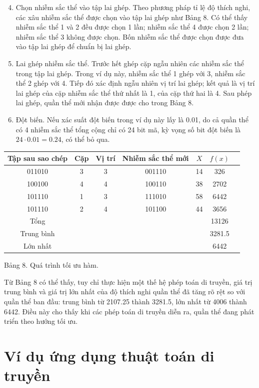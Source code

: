 \documentclass[11pt]{article}
\begin{document}
\begin{enumerate}
  \setcounter{enumi}{3}
  \item Chọn nhiễm sắc thể vào tập lai ghép. Theo phương pháp tỉ lệ độ thích
  nghi, các xâu nhiễm sắc thể được chọn vào tập lai ghép như Bảng 8. Có thể
  thấy nhiễm sắc thể 1 và 2 đều được chọn 1 lần; nhiễm sắc thể 4 được chọn 2
  lần; nhiễm sắc thể 3 không được chọn. Bốn nhiễm sắc thể được chọn được đưa
  vào tập lai ghép để chuẩn bị lai ghép.
  \item Lai ghép nhiễm sắc thể. Trước hết ghép cặp ngẫu nhiên các nhiễm sắc
  thể trong tập lai ghép. Trong ví dụ này, nhiễm sắc thể 1 ghép với 3, nhiễm
  sắc thể 2 ghép với 4. Tiếp đó xác định ngẫu nhiên vị trí lai ghép; kết quả
  là vị trí lai ghép của cặp nhiễm sắc thể thứ nhất là 1, của cặp thứ hai là
  4. Sau phép lai ghép, quần thể mới nhận được được cho trong Bảng 8.
  \item Đột biến. Nếu xác suất đột biến trong ví dụ này lấy là 0.01, do cả
  quần thể có 4 nhiễm sắc thể tổng cộng chỉ có 24 bit mã, kỳ vọng số bit đột
  biến là \(24\cdot 0.01=0.24\), có thể bỏ qua.
\end{enumerate}

\begin{center}
\begin{tabular}{c|cccccc}
Tập sau sao chép & Cặp & Vị trí & Nhiễm sắc thể mới & \(X\) & \(f(x)\)\\ \hline
011010 & 3 & 3 & 001110 & 14 & 326\\
100100 & 4 & 4 & 100110 & 38 & 2702\\
101110 & 1 & 3 & 111010 & 58 & 6442\\
101110 & 2 & 4 & 101100 & 44 & 3656\\ \hline
Tổng & & & & & 13126\\
Trung bình & & & & & 3281.5\\
Lớn nhất & & & & & 6442
\end{tabular}

Bảng 8. Quá trình tối ưu hàm.
\end{center}

Từ Bảng 8 có thể thấy, tuy chỉ thực hiện một thế hệ phép toán di truyền, giá
trị trung bình và giá trị lớn nhất của độ thích nghi quần thể đã tăng rõ rệt
so với quần thể ban đầu: trung bình từ 2107.25 thành 3281.5, lớn nhất từ
4006 thành 6442. Điều này cho thấy khi các phép toán di truyền diễn ra, quần
thể đang phát triển theo hướng tối ưu.

\section{Ví dụ ứng dụng thuật toán di truyền}
\end{document}
